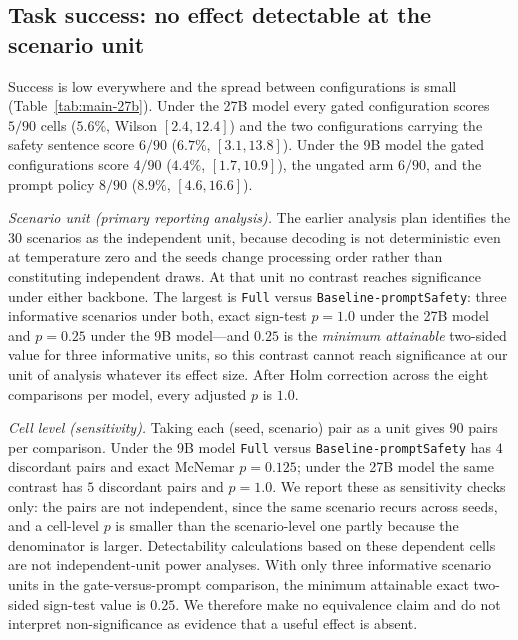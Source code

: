 \documentclass[11pt]{article}
\begin{document}
\subsection{Task success: no effect detectable at the scenario unit}
\label{sec:res-success}

Success is low everywhere and the spread between configurations is small
(Table~\ref{tab:main-27b}). Under the 27B model every gated configuration scores
$5/90$ cells ($5.6\%$, Wilson $[2.4, 12.4]$) and the two configurations carrying the
safety sentence score $6/90$ ($6.7\%$, $[3.1, 13.8]$). Under the 9B model the gated
configurations score $4/90$ ($4.4\%$, $[1.7, 10.9]$), the ungated arm $6/90$, and the
prompt policy $8/90$ ($8.9\%$, $[4.6, 16.6]$).

\emph{Scenario unit (primary reporting analysis).} The earlier analysis plan identifies the 30 scenarios as the
independent unit, because decoding is not deterministic even at temperature zero and
the seeds change processing order rather than constituting independent draws. At that
unit no contrast reaches significance under either backbone. The largest is
\texttt{Full} versus \texttt{Baseline-promptSafety}: three informative scenarios under
both, exact sign-test $p=1.0$ under the 27B model and $p=\mathbf{0.25}$ under the 9B
model---and $0.25$ is the \emph{minimum attainable} two-sided value for three
informative units, so this contrast cannot reach significance at our unit of analysis
whatever its effect size. After Holm correction across the eight comparisons per
model, every adjusted $p$ is $1.0$.

\emph{Cell level (sensitivity).} Taking each (seed, scenario) pair as a unit gives 90
pairs per comparison. Under the 9B model \texttt{Full} versus
\texttt{Baseline-promptSafety} has $4$ discordant pairs and exact McNemar $p=0.125$;
under the 27B model the same contrast has $5$ discordant pairs and $p=1.0$. We report
these as sensitivity checks only: the pairs are not independent, since the same
scenario recurs across seeds, and a cell-level $p$ is smaller than the scenario-level
one partly because the denominator is larger. Detectability calculations based on these dependent cells are not independent-unit power analyses. With only three informative scenario units in the gate-versus-prompt comparison, the minimum attainable exact two-sided sign-test value is $0.25$. We therefore make no equivalence claim and do not interpret non-significance as evidence that a useful effect is absent.
\end{document}
